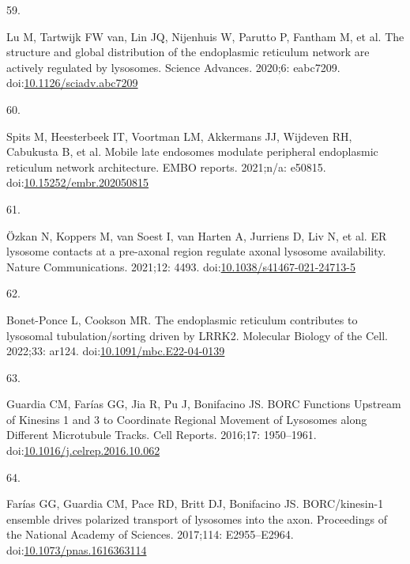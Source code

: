 \documentclass[
  12pt,
  a4paper,
]{book}
\newlength{\cslhangindent}
\newlength{\csllabelwidth}
\newlength{\cslentryspacingunit} %
\newenvironment{CSLReferences}[2] %
 {%
  \setlength{\parindent}{0pt}
  \ifodd #1
  \let\oldpar\par
  \def\par{\hangindent=\cslhangindent\oldpar}
  \fi
  \setlength{\parskip}{#2\cslentryspacingunit}
 }%
 {}
\newcommand{\CSLLeftMargin}[1]{\parbox[t]{\csllabelwidth}{#1}}
\newcommand{\CSLRightInline}[1]{\parbox[t]{\linewidth - \csllabelwidth}{#1}\break}
\begin{document}
\begin{CSLReferences}{0}{0}
\leavevmode{}%
\CSLLeftMargin{59. }%
\CSLRightInline{Lu M, Tartwijk FW van, Lin JQ, Nijenhuis W, Parutto P, Fantham M, et al. The structure and global distribution of the endoplasmic reticulum network are actively regulated by lysosomes. Science Advances. 2020;6: eabc7209. doi:\href{https://doi.org/10.1126/sciadv.abc7209}{10.1126/sciadv.abc7209}}

\leavevmode{}%
\CSLLeftMargin{60. }%
\CSLRightInline{Spits M, Heesterbeek IT, Voortman LM, Akkermans JJ, Wijdeven RH, Cabukusta B, et al. Mobile late endosomes modulate peripheral endoplasmic reticulum network architecture. EMBO reports. 2021;n/a: e50815. doi:\href{https://doi.org/10.15252/embr.202050815}{10.15252/embr.202050815}}

\leavevmode{}%
\CSLLeftMargin{61. }%
\CSLRightInline{Özkan N, Koppers M, van Soest I, van Harten A, Jurriens D, Liv N, et al. {ER} \textendash{} lysosome contacts at a pre-axonal region regulate axonal lysosome availability. Nature Communications. 2021;12: 4493. doi:\href{https://doi.org/10.1038/s41467-021-24713-5}{10.1038/s41467-021-24713-5}}

\leavevmode{}%
\CSLLeftMargin{62. }%
\CSLRightInline{Bonet-Ponce L, Cookson MR. The endoplasmic reticulum contributes to lysosomal tubulation/sorting driven by {LRRK2}. Molecular Biology of the Cell. 2022;33: ar124. doi:\href{https://doi.org/10.1091/mbc.E22-04-0139}{10.1091/mbc.E22-04-0139}}

\leavevmode{}%
\CSLLeftMargin{63. }%
\CSLRightInline{Guardia CM, Farías GG, Jia R, Pu J, Bonifacino JS. {BORC Functions Upstream} of {Kinesins} 1 and 3 to {Coordinate Regional Movement} of {Lysosomes} along {Different Microtubule Tracks}. Cell Reports. 2016;17: 1950--1961. doi:\href{https://doi.org/10.1016/j.celrep.2016.10.062}{10.1016/j.celrep.2016.10.062}}

\leavevmode{}%
\CSLLeftMargin{64. }%
\CSLRightInline{Farías GG, Guardia CM, Pace RD, Britt DJ, Bonifacino JS. {BORC}/kinesin-1 ensemble drives polarized transport of lysosomes into the axon. Proceedings of the National Academy of Sciences. 2017;114: E2955--E2964. doi:\href{https://doi.org/10.1073/pnas.1616363114}{10.1073/pnas.1616363114}}


\end{CSLReferences}
\end{document}

